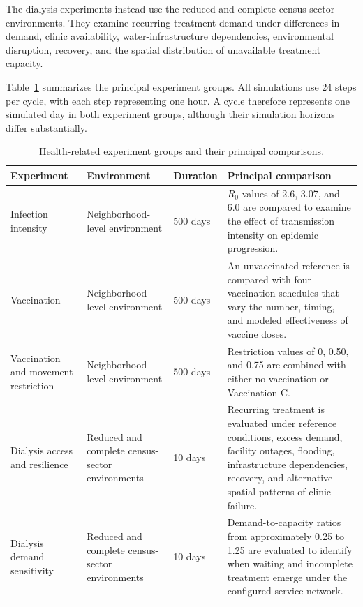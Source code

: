 The dialysis experiments instead use the reduced and complete census-sector environments. They examine recurring treatment demand under differences in demand, clinic availability, water-infrastructure dependencies, environmental disruption, recovery, and the spatial distribution of unavailable treatment capacity.

Table~\ref{tbl:health_results_overview} summarizes the principal experiment groups. All simulations use 24 steps per cycle, with each step representing one hour. A cycle therefore represents one simulated day in both experiment groups, although their simulation horizons differ substantially.

\begin{table}[ht]
\centering
\footnotesize
\setlength{\tabcolsep}{4pt}
\caption{Health-related experiment groups and their principal comparisons.}
\label{tbl:health_results_overview}
\begin{tabularx}{\linewidth}{@{}p{3.0cm}p{3.0cm}p{1.6cm}X@{}}
\toprule
\textbf{Experiment} &
\textbf{Environment} &
\textbf{Duration} &
\textbf{Principal comparison} \\
\midrule

Infection intensity
& Neighborhood-level environment
& 500 days
& $R_0$ values of 2.6, 3.07, and 6.0 are compared to examine the effect of transmission intensity on epidemic progression. \\

Vaccination
& Neighborhood-level environment
& 500 days
& An unvaccinated reference is compared with four vaccination schedules that vary the number, timing, and modeled effectiveness of vaccine doses. \\

Vaccination and movement restriction
& Neighborhood-level environment
& 500 days
& Restriction values of 0, 0.50, and 0.75 are combined with either no vaccination or Vaccination C. \\

Dialysis access and resilience
& Reduced and complete census-sector environments
& 10 days
& Recurring treatment is evaluated under reference conditions, excess demand, facility outages, flooding, infrastructure dependencies, recovery, and alternative spatial patterns of clinic failure. \\

Dialysis demand sensitivity
& Reduced and complete census-sector environments
& 10 days
& Demand-to-capacity ratios from approximately 0.25 to 1.25 are evaluated to identify when waiting and incomplete treatment emerge under the configured service network. \\

\bottomrule
\end{tabularx}
\end{table}



